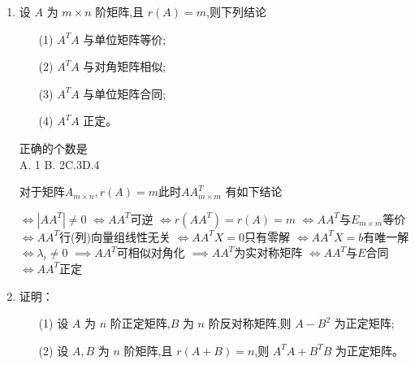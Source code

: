 \documentclass[12pt, a4paper, oneside, UTF8]{ctexbook}
\begin{document}
\begin{enumerate}[label=\arabic*.,start=6]
    \item 设 $ A $ 为 $ m \times n $ 阶矩阵,且 $ r(A) = m $,则下列结论
    \begin{enumerate}
        \item[(1)] $ A^T A $ 与单位矩阵等价;
        \item[(2)] $ A^T A $ 与对角矩阵相似;
        \item[(3)] $ A^T A $ 与单位矩阵合同;
        \item[(4)] $ A^T A $ 正定。
    \end{enumerate}
    正确的个数是 \\
    A. 1 \qquad B. 2\qquad C.3\qquad D.4 
    
    \begin{corollary}[$r(A)=m$时有关$AA^T$的结论]
        对于矩阵$A_{m\times n},r(A)=m$此时$AA^T_{m\times m}$ 有如下结论 
        \begin{choices}[2]
        \task $\iff \left|AA^T\right|\neq 0$ \task $\iff AA^T$可逆 
        \task $\iff r(AA^T)=r(A)=m$  \task $\iff AA^T$与$E_{m\times m}$等价 
        \task $\iff AA^T$行(列)向量组线性无关 \task $\iff AA^TX=0$只有零解
        \task $\iff AA^TX=b$有唯一解 
        \task $\iff \lambda_i\neq 0$ \task $\implies AA^T$可相似对角化 
        \task $\implies AA^T$为实对称矩阵 \task $\iff AA^T$与$E$合同 
        \task $\iff AA^T$正定
        \end{choices}
    \end{corollary}
    
    \item 证明：
    \begin{enumerate}
        \item[(1)] 设 $ A $ 为 $ n $ 阶正定矩阵,$ B $ 为 $ n $ 阶反对称矩阵,则 $ A - B^2 $ 为正定矩阵;
        \item[(2)] 设 $ A, B $ 为 $ n $ 阶矩阵,且 $ r(A + B) = n $,则 $ A^T A + B^T B $ 为正定矩阵。
    \end{enumerate}
    

\end{enumerate}
\end{document}
